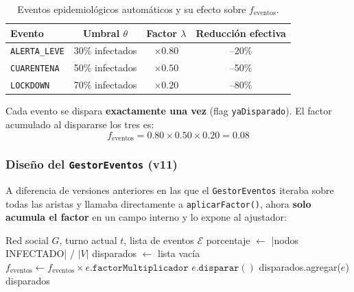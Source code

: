 \documentclass[spanish,notitlepage,letterpaper, 12pt]{article}
\begin{document}
\begin{table}[H]
\centering
\caption{Eventos epidemiol\'ogicos autom\'aticos y su efecto sobre $f_{\text{eventos}}$.}
\label{tab:eventos}
\begin{tabular}{l c c c}
\toprule
\textbf{Evento} & \textbf{Umbral $\theta$} & \textbf{Factor $\lambda$} & \textbf{Reducci\'on efectiva} \\
\midrule
\texttt{ALERTA\_LEVE} & 30\% infectados & $\times 0.80$ & --20\% \\
\texttt{CUARENTENA} & 50\% infectados & $\times 0.50$ & --50\% \\
\texttt{LOCKDOWN} & 70\% infectados & $\times 0.20$ & --80\% \\
\bottomrule
\end{tabular}
\end{table}

Cada evento se dispara \textbf{exactamente una vez} (flag \texttt{yaDisparado}). El factor acumulado al dispararse los tres es:
\[
f_{\text{eventos}} = 0.80 \times 0.50 \times 0.20 = 0.08
\]

\subsubsection{Dise\~no del \texttt{GestorEventos} (v11)}

A diferencia de versiones anteriores en las que el \texttt{GestorEventos} iteraba sobre todas las aristas y llamaba directamente a \texttt{aplicarFactor()}, ahora \textbf{solo acumula el factor} en un campo interno y lo expone al ajustador:

\begin{algorithm}[H]
\caption{\texttt{GestorEventos.evaluar} -- acumula el factor NPI, ya no modifica aristas}
\begin{algorithmic}[1]
\Require Red social $G$, turno actual $t$, lista de eventos $\mathcal{E}$
\State porcentaje $\gets$ |nodos INFECTADO| / $|V|$
\State disparados $\gets$ lista vac\'ia
        \State $f_{\text{eventos}} \gets f_{\text{eventos}} \times e.\texttt{factorMultiplicador}$
        \State $e.\texttt{disparar}()$ 
        \State disparados.agregar($e$)
    \EndIf
\EndFor
\State \Return disparados 
\end{algorithmic}
\end{algorithm}
\end{document}
